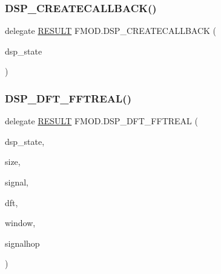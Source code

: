 \mbox{\label{namespace_f_m_o_d_a197a0679ad072fd7854ff4b449c8ebeb}} 
\subsubsection{\texorpdfstring{D\+S\+P\+\_\+\+C\+R\+E\+A\+T\+E\+C\+A\+L\+L\+B\+A\+C\+K()}{DSP\_CREATECALLBACK()}}
{\footnotesize\ttfamily delegate \hyperlink{namespace_f_m_o_d_a305d1176ef3f8c8815861a60407ac33d}{R\+E\+S\+U\+LT} F\+M\+O\+D.\+D\+S\+P\+\_\+\+C\+R\+E\+A\+T\+E\+C\+A\+L\+L\+B\+A\+CK (\begin{DoxyParamCaption}\item[{ref \hyperlink{struct_f_m_o_d_1_1_d_s_p___s_t_a_t_e}{D\+S\+P\+\_\+\+S\+T\+A\+TE}}]{dsp\+\_\+state }\end{DoxyParamCaption})}

\mbox{\label{namespace_f_m_o_d_aa012e977ef18d324c0c35f6b708c131d}} 
\subsubsection{\texorpdfstring{D\+S\+P\+\_\+\+D\+F\+T\+\_\+\+F\+F\+T\+R\+E\+A\+L()}{DSP\_DFT\_FFTREAL()}}
{\footnotesize\ttfamily delegate \hyperlink{namespace_f_m_o_d_a305d1176ef3f8c8815861a60407ac33d}{R\+E\+S\+U\+LT} F\+M\+O\+D.\+D\+S\+P\+\_\+\+D\+F\+T\+\_\+\+F\+F\+T\+R\+E\+AL (\begin{DoxyParamCaption}\item[{ref \hyperlink{struct_f_m_o_d_1_1_d_s_p___s_t_a_t_e}{D\+S\+P\+\_\+\+S\+T\+A\+TE}}]{dsp\+\_\+state,  }\item[{int}]{size,  }\item[{Int\+Ptr}]{signal,  }\item[{Int\+Ptr}]{dft,  }\item[{Int\+Ptr}]{window,  }\item[{int}]{signalhop }\end{DoxyParamCaption})}

